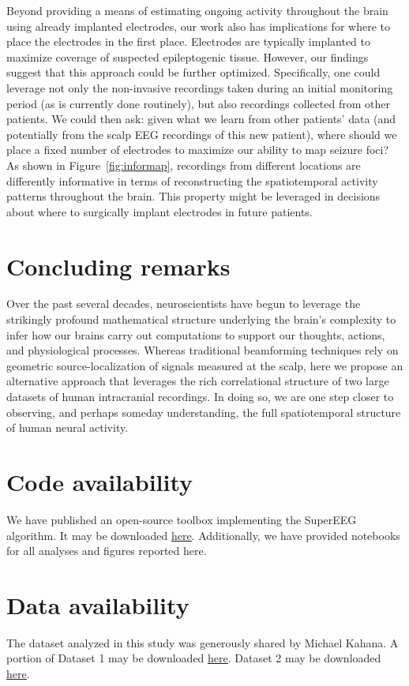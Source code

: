 \documentclass[11pt]{article}
\begin{document}
Beyond providing a means of estimating ongoing activity throughout the
brain using already implanted electrodes, our work also has
implications for where to place the electrodes in the first place.
Electrodes are typically implanted to maximize coverage of suspected
epileptogenic tissue.  However, our findings suggest that this
approach could be further optimized.  Specifically, one could leverage
not only the non-invasive recordings taken during an initial
monitoring period (as is currently done routinely), but also
recordings collected from other patients.  We could then ask: given
what we learn from other patients' data (and potentially from the
scalp EEG recordings of this new patient), where should we place a
fixed number of electrodes to maximize our ability to map seizure
foci?  As shown in Figure~\ref{fig:informap}, recordings from
different locations are differently informative in terms of
reconstructing the spatiotemporal activity patterns throughout the
brain.  This property might be leveraged in decisions about where to
surgically implant electrodes in future patients.

\section*{Concluding remarks}
Over the past several decades, neuroscientists have begun to leverage
the strikingly profound mathematical structure underlying the brain's
complexity to infer how our brains carry out computations to support
our thoughts, actions, and physiological processes.  Whereas
traditional beamforming techniques rely on geometric
source-localization of signals measured at the scalp, here we propose
an alternative approach that leverages the rich correlational
structure of two large datasets of human intracranial recordings.  In
doing so, we are one step closer to observing, and perhaps
someday understanding, the full spatiotemporal structure of human
neural activity.

\section*{Code availability}
We have published an open-source toolbox implementing the SuperEEG
algorithm.  It may be downloaded
\href{https://supereeg.readthedocs.io/en/latest/}{\underline{here}}. Additionally,
we have provided notebooks for all analyses and figures reported
here.  

\section*{Data availability}
The dataset analyzed in this study was generously shared by Michael Kahana.  A portion of Dataset 1 may be downloaded
\href{http://memory.psych.upenn.edu/Request_EEG_access?paper=SedeEtal03}{\underline{here}}.
Dataset 2 may be downloaded
\href{http://memory.psych.upenn.edu/Request_EEG_access?paper=EzzyEtal17}{\underline{here}}.
\end{document}
